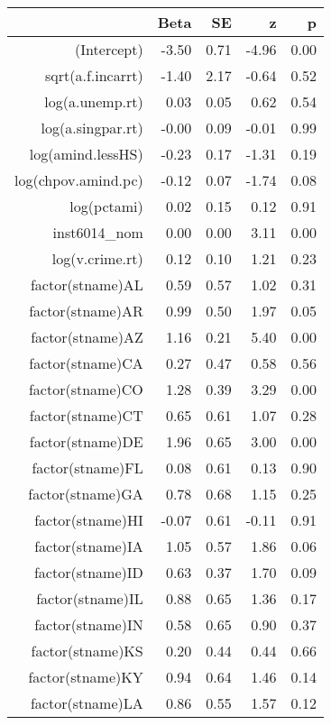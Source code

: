\begin{table}[ht]
\centering
\begin{tabular}{rrrrr}
  \hline
 & Beta & SE & z & p \\ 
  \hline
(Intercept) & -3.50 & 0.71 & -4.96 & 0.00 \\ 
  sqrt(a.f.incarrt) & -1.40 & 2.17 & -0.64 & 0.52 \\ 
  log(a.unemp.rt) & 0.03 & 0.05 & 0.62 & 0.54 \\ 
  log(a.singpar.rt) & -0.00 & 0.09 & -0.01 & 0.99 \\ 
  log(amind.lessHS) & -0.23 & 0.17 & -1.31 & 0.19 \\ 
  log(chpov.amind.pc) & -0.12 & 0.07 & -1.74 & 0.08 \\ 
  log(pctami) & 0.02 & 0.15 & 0.12 & 0.91 \\ 
  inst6014\_nom & 0.00 & 0.00 & 3.11 & 0.00 \\ 
  log(v.crime.rt) & 0.12 & 0.10 & 1.21 & 0.23 \\ 
  factor(stname)AL & 0.59 & 0.57 & 1.02 & 0.31 \\ 
  factor(stname)AR & 0.99 & 0.50 & 1.97 & 0.05 \\ 
  factor(stname)AZ & 1.16 & 0.21 & 5.40 & 0.00 \\ 
  factor(stname)CA & 0.27 & 0.47 & 0.58 & 0.56 \\ 
  factor(stname)CO & 1.28 & 0.39 & 3.29 & 0.00 \\ 
  factor(stname)CT & 0.65 & 0.61 & 1.07 & 0.28 \\ 
  factor(stname)DE & 1.96 & 0.65 & 3.00 & 0.00 \\ 
  factor(stname)FL & 0.08 & 0.61 & 0.13 & 0.90 \\ 
  factor(stname)GA & 0.78 & 0.68 & 1.15 & 0.25 \\ 
  factor(stname)HI & -0.07 & 0.61 & -0.11 & 0.91 \\ 
  factor(stname)IA & 1.05 & 0.57 & 1.86 & 0.06 \\ 
  factor(stname)ID & 0.63 & 0.37 & 1.70 & 0.09 \\ 
  factor(stname)IL & 0.88 & 0.65 & 1.36 & 0.17 \\ 
  factor(stname)IN & 0.58 & 0.65 & 0.90 & 0.37 \\ 
  factor(stname)KS & 0.20 & 0.44 & 0.44 & 0.66 \\ 
  factor(stname)KY & 0.94 & 0.64 & 1.46 & 0.14 \\ 
  factor(stname)LA & 0.86 & 0.55 & 1.57 & 0.12 \\ 

\end{tabular}
\end{table}
